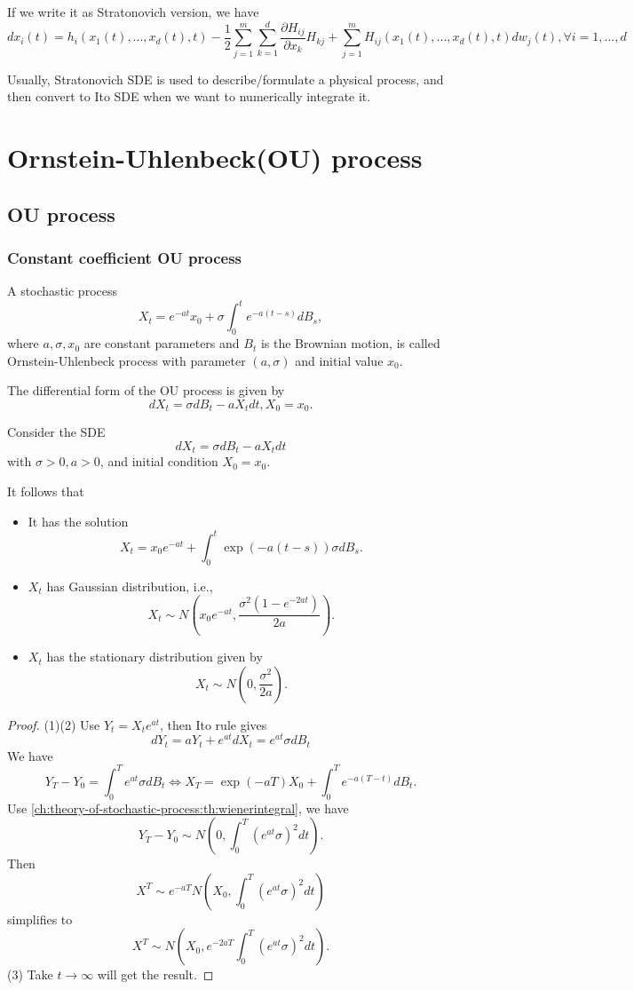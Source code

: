 \begin{refsection}
If we write it as Stratonovich version, we have
$$dx_i(t)=h_i(x_1(t),...,x_d(t),t)-\frac{1}{2}\sum_{j=1}^m\sum_{k=1}^d\frac{\partial H_{ij}}{\partial x_k}H_{kj} + \sum_{j=1}^mH_{ij}(x_1(t),...,x_d(t),t)dw_j(t),\forall i=1,...,d$$


Usually, Stratonovich SDE is used to describe/formulate a physical process, and then convert to Ito SDE when we want to numerically integrate it. 

\section{Ornstein-Uhlenbeck(OU) process}\label{ch:theory-of-stochastic-process:sec:OUProcesses}
\subsection{OU process}
\subsubsection{Constant coefficient OU process}
\begin{definition}
	A stochastic process 
	$$X_t = e^{-at}x_0 + \sigma \int_0^t e^{-a(t-s)}dB_s,$$
	where $a, \sigma,x_0$ are constant parameters and $B_t$ is the Brownian motion,
	is called Ornstein-Uhlenbeck process with parameter $(a,\sigma)$ and initial value $x_0 $.
	
	The differential form of the OU process is given by
	$$dX_t = \sigma dB_t - aX_t dt, X_0 = x_0.$$
\end{definition}


\begin{lemma}\label{ch:theory-of-stochastic-process:th:OUprocesssolution}
	Consider	the SDE
	$$dX_t = \sigma dB_t - aX_t dt$$
	with $\sigma > 0, a > 0$, and initial condition $X_0 = x_0$.
	
	It follows that
	\begin{itemize}
		\item It has  the solution 
		$$X_t = x_0 e^{-at} + \int_0^t \exp(-a(t-s))\sigma dB_s.$$
		\item $X_t$ has Gaussian distribution, i.e.,  
		$$X_t \sim N(x_0 e^{-at}, \frac{\sigma^2(1- e^{-2at})}{2a}).$$
		\item $X_t$ has the stationary distribution given by
		$$X_t \sim N(0, \frac{\sigma^2}{2a}).$$
	\end{itemize}
\end{lemma}
\begin{proof}
	(1)(2)	
	Use $Y_t = X_te^{at}$, then Ito rule gives
	$$dY_t = aY_t + e^{at}dX_t = e^{at}\sigma dB_t$$
	We have
	$$Y_T - Y_0 = \int_0^Te^{at} \sigma dB_t \Leftrightarrow X_T = \exp(-aT)X_0 + \int_0^Te^{-a(T-t)}dB_t.$$
	Use \autoref{ch:theory-of-stochastic-process:th:wienerintegral}, we have
	$$Y_T - Y_0 \sim N(0, \int_0^T(e^{at} \sigma)^2 dt).$$
	Then
	$$X^T \sim e^{-aT}N(X_0, \int_0^T(e^{at} \sigma)^2 dt)$$
	simplifies to
	$$X^T \sim N(X_0, e^{-2aT}\int_0^T(e^{at} \sigma)^2 dt).$$
	(3) Take $t\to \infty$ will get the result.
\end{proof}



\end{refsection}
